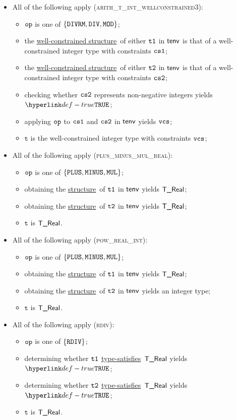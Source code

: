 \documentclass{book}
\newcommand\ProseOrTypeError[0]{\ProseTerminateAs{\TypeErrorConfig}}
\newcommand\structure[0]{\hyperlink{def-structure}{structure}}
\newcommand\typesatisfies[0]{\hyperlink{def-typesatisfies}{type-satisfies}}
\newcommand\wellconstrainedstructure[0]{\hyperlink{def-getwellconstrainedstructure}{well-constrained structure}}
\newcommand\vt[0]{\texttt{t}}
\begin{document}
\begin{itemize}
  \item All of the following apply (\textsc{arith\_t\_int\_wellconstrained3}):
  \begin{itemize}
    \item $\texttt{op}$ is one of $\{\texttt{DIVRM}, \texttt{DIV}, \texttt{MOD}\}$;
    \item the \wellconstrainedstructure\ of either $\texttt{t1}$ in $\textsf{tenv}$ is that of a well-constrained integer type with
          constraints $\texttt{cs1}$;
          \item the \wellconstrainedstructure\ of either $\texttt{t2}$ in $\textsf{tenv}$ is that of a well-constrained integer type with
          constraints $\texttt{cs2}$;
    \item checking whether $\texttt{cs2}$ represents non-negative integers yields $\True$\ProseOrTypeError;
    \item applying $\texttt{op}$ to $\texttt{cs1}$ and $\texttt{cs2}$ in $\textsf{tenv}$ yields $\texttt{vcs}$;
    \item $\vt$ is the well-constrained integer type with constraints $\texttt{vcs}$;
  \end{itemize}

  \item All of the following apply (\textsc{plus\_minus\_mul\_real}):
  \begin{itemize}
    \item $\texttt{op}$ is one of $\{\texttt{PLUS}, \texttt{MINUS}, \texttt{MUL}\}$;
    \item obtaining the \structure\ of $\texttt{t1}$ in $\textsf{tenv}$ yields $\textsf{T\_Real}$;
    \item obtaining the \structure\ of $\texttt{t2}$ in $\textsf{tenv}$ yields $\textsf{T\_Real}$;
    \item $\vt$ is $\textsf{T\_Real}$.
  \end{itemize}

  \item All of the following apply (\textsc{pow\_real\_int}):
  \begin{itemize}
    \item $\texttt{op}$ is one of $\{\texttt{PLUS}, \texttt{MINUS}, \texttt{MUL}\}$;
    \item obtaining the \structure\ of $\texttt{t1}$ in $\textsf{tenv}$ yields $\textsf{T\_Real}$;
    \item obtaining the \structure\ of $\texttt{t2}$ in $\textsf{tenv}$ yields an integer type;
    \item $\vt$ is $\textsf{T\_Real}$.
  \end{itemize}

  \item All of the following apply (\textsc{rdiv}):
  \begin{itemize}
    \item $\texttt{op}$ is one of $\{\texttt{RDIV}\}$;
    \item determining whether $\texttt{t1}$ \typesatisfies\ $\textsf{T\_Real}$ yields $\True$\ProseOrTypeError;
    \item determining whether $\texttt{t2}$ \typesatisfies\ $\textsf{T\_Real}$ yields $\True$\ProseOrTypeError;
    \item $\vt$ is $\textsf{T\_Real}$.
  \end{itemize}
\end{itemize}
\end{document}
